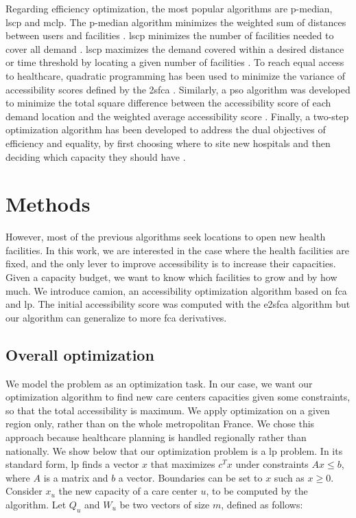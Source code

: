 Regarding efficiency optimization, the most popular algorithms are p-median,
\ac{lscp} and \ac{mclp}. The p-median algorithm minimizes the weighted sum of
distances between users and facilities \cite{murad_using_2021}. \ac{lscp}
minimizes the number of facilities needed to cover all demand
\cite{shavandi_fuzzy_2006}. \ac{lscp} maximizes the demand covered within a
desired distance or time threshold by locating a given number of facilities
\cite{casado_heuristical_2005}. To reach equal access to healthcare, quadratic
programming has been used to  minimize the variance of accessibility scores
defined by the \ac{2sfca} \cite{wang_planning_2013}. Similarly, a \ac{pso}
algorithm was developed to minimize the total square difference between the
accessibility score of each demand location and the weighted average
accessibility score \cite{tao_spatial_2014}. Finally, a two-step optimization
algorithm has been developed to address the dual objectives of efficiency and
equality, by first choosing where to site new hospitals and then deciding which
capacity they should have \cite{luo_two-step_2017,li_two-step_2017}.

\section{Methods}

However, most of the previous algorithms seek locations to open new health
facilities. In this work, we are interested in the case where the health
facilities are fixed, and the only lever to improve accessibility is to increase
their capacities. Given a capacity budget, we want to know which facilities to
grow and by how much. We introduce \ac{camion}, an accessibility optimization
algorithm based on \ac{fca} and \ac{lp}. The initial accessibility score was
computed with the \ac{e2sfca} algorithm \cite{luo_enhanced_2009} but our
algorithm can generalize to more \ac{fca} derivatives.

\subsection{Overall optimization}

We model the problem as an optimization task. In our case, we want our
optimization algorithm to find new care centers capacities given some
constraints, so that the total accessibility is maximum. We apply optimization
on a given region only, rather than on the whole metropolitan France. We chose
this approach because healthcare planning is handled regionally rather than
nationally. We show below that our optimization problem is a \ac{lp} problem. In
its standard form, \ac{lp} finds a vector $x$ that maximizes $c^T x$ under
constraints $Ax \leq b$, where $A$ is a matrix and $b$ a vector. Boundaries can
be set to $x$ such as $x \geq 0$. Consider $x_u$ the new capacity of a care
center $u$, to be computed by the algorithm. Let $Q_u$ and $W_u$ be two vectors
of size $m$, defined as follows:

